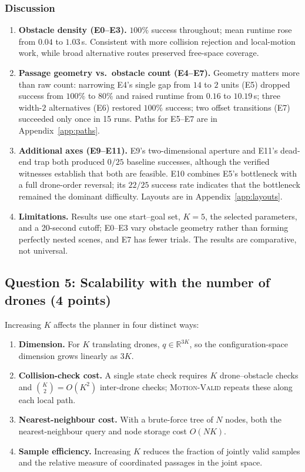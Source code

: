 \documentclass[11pt,a4paper]{article}
\begin{document}
\subsubsection*{Discussion}
\begin{enumerate}[label=(\arabic*),nosep]
  \item \textbf{Obstacle density (E0--E3).} $100\%$ success throughout;
        mean runtime rose from $0.04$ to $1.03$\,s. Consistent with more
        collision rejection and local-motion work, while broad alternative
        routes preserved free-space coverage.
  \item \textbf{Passage geometry vs.\ obstacle count (E4--E7).} Geometry
        matters more than raw count: narrowing E4's single gap from $14$ to
        $2$ units (E5) dropped success from $100\%$ to $80\%$ and raised
        runtime from $0.16$ to $10.19$\,s; three width-$2$ alternatives
        (E6) restored $100\%$ success; two offset transitions (E7)
        succeeded only once in 15 runs. Paths for E5--E7 are in
        Appendix~\ref{app:paths}.
  \item \textbf{Additional axes (E9--E11).} E9's two-dimensional aperture
        and E11's dead-end trap both produced $0/25$ baseline successes,
        although the verified witnesses establish that both are feasible.
        E10 combines E5's bottleneck with a full drone-order reversal; its
        $22/25$ success rate indicates that the bottleneck remained the
        dominant difficulty. Layouts are in Appendix~\ref{app:layouts}.
  \item \textbf{Limitations.} Results use one start--goal set, $K=5$, the
        selected parameters, and a 20-second cutoff; E0--E3 vary obstacle
        geometry rather than forming perfectly nested scenes, and E7 has
        fewer trials. The results are comparative, not universal.
\end{enumerate}

\subsection*{Question 5: Scalability with the number of drones (4 points)}

Increasing $K$ affects the planner in four distinct ways:
\begin{enumerate}[label=(\arabic*),nosep]
  \item \textbf{Dimension.} For $K$ translating drones, $q\in\mathbb{R}^{3K}$,
        so the configuration-space dimension grows linearly as $3K$.
  \item \textbf{Collision-check cost.} A single state check requires $K$
        drone--obstacle checks and $\binom{K}{2}=O(K^2)$ inter-drone checks;
        \textsc{Motion-Valid} repeats these along each local path.
  \item \textbf{Nearest-neighbour cost.} With a brute-force tree of $N$
        nodes, both the nearest-neighbour query and node storage cost
        $O(NK)$.
  \item \textbf{Sample efficiency.} Increasing $K$ reduces the fraction of
        jointly valid samples and the relative measure of coordinated
        passages in the joint space.
\end{enumerate}
\end{document}
